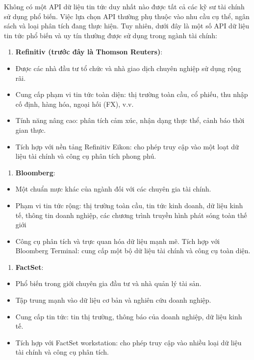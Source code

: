 Không có một API dữ liệu tin tức duy nhất nào được tất cả các kỹ sư tài chính sử dụng phổ biến. Việc lựa chọn API thường phụ thuộc vào nhu cầu cụ thể, ngân sách và loại phân tích đang thực hiện. Tuy nhiên, dưới đây là một số API dữ liệu tin tức phổ biến và uy tín thường được sử dụng trong ngành tài chính:

\begin{enumerate}
\def\labelenumi{\arabic{enumi}.}
\item
  \textbf{Refinitiv (trước đây là Thomson Reuters)}:
\end{enumerate}

\begin{itemize}
\item
  Được các nhà đầu tư tổ chức và nhà giao dịch chuyên nghiệp sử dụng rộng rãi.
\item
  Cung cấp phạm vi tin tức toàn diện: thị trường toàn cầu, cổ phiếu, thu nhập cố định, hàng hóa, ngoại hối (FX), v.v.
\item
  Tính năng nâng cao: phân tích cảm xúc, nhận dạng thực thể, cảnh báo thời gian thực.
\item
  Tích hợp với nền tảng Refinitiv Eikon: cho phép truy cập vào một loạt dữ liệu tài chính và công cụ phân tích phong phú.
\end{itemize}

\begin{enumerate}
\def\labelenumi{\arabic{enumi}.}
\setcounter{enumi}{1}
\item
  \textbf{Bloomberg}:
\end{enumerate}

\begin{itemize}
\item
  Một chuẩn mực khác của ngành đối với các chuyên gia tài chính.
\item
  Phạm vi tin tức rộng: thị trường toàn cầu, tin tức kinh doanh, dữ liệu kinh tế, thông tin doanh nghiệp, các chương trình truyền hình phát sóng toàn thế giới
\item
  Công cụ phân tích và trực quan hóa dữ liệu mạnh mẽ. Tích hợp với Bloomberg Terminal: cung cấp một bộ dữ liệu tài chính và công cụ toàn diện.
\end{itemize}

\begin{enumerate}
\def\labelenumi{\arabic{enumi}.}
\setcounter{enumi}{2}
\item
  \textbf{FactSet}:
\end{enumerate}

\begin{itemize}
\item
  Phổ biến trong giới chuyên gia đầu tư và nhà quản lý tài sản.
\item
  Tập trung mạnh vào dữ liệu cơ bản và nghiên cứu doanh nghiệp.
\item
  Cung cấp tin tức: tin thị trường, thông báo của doanh nghiệp, dữ liệu kinh tế.
\item
  Tích hợp với FactSet workstation: cho phép truy cập vào nhiều loại dữ liệu tài chính và công cụ phân tích.
\end{itemize}

